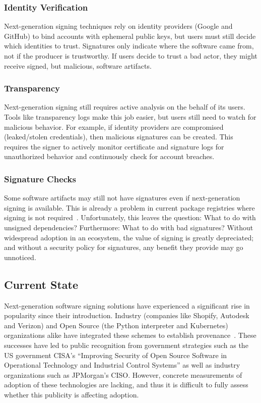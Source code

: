 \documentclass{IEEEcsmagTechrxiv}
\begin{document}
\subsubsection{Identity Verification}
Next-generation signing techniques rely on identity providers (\eg Google and GitHub) to bind accounts with ephemeral public keys, but users must still decide which identities to trust.
Signatures only indicate where the software came from, not if the producer is trustworthy.
If users decide to trust a bad actor, they might receive signed, but malicious, software artifacts.

\subsubsection{Transparency}
Next-generation signing still requires active analysis on the behalf of its users.
Tools like transparency logs make this job easier, but users still need to watch for malicious behavior.
For example, if identity providers are compromised (\eg leaked/stolen credentials), then malicious signatures can be created.
This requires the signer to actively monitor certificate and signature logs for unauthorized behavior and continuously check for account breaches.

\subsubsection{Signature Checks}
Some software artifacts may still not have signatures even if next-generation signing is available.
This is already a problem in current package registries where signing is not required~\cite{schorlemmer_signing}.
Unfortunately, this leaves the question: What to do with unsigned dependencies?
Furthermore: What to do with bad signatures?
Without widespread adoption in an ecosystem, the value of signing is greatly depreciated; and without a security policy for signatures, any benefit they provide may go unnoticed.

\subsection{Current State}

Next-generation software signing solutions have experienced a significant rise in popularity since their introduction.
Industry (\eg companies like Shopify, Autodesk and Verizon) and Open Source (\eg the Python interpreter and Kubernetes) organizations alike have integrated these schemes to establish provenance~\cite{SigstorePaper, SperanzaPaper}.
These successes have led to public recognition from government strategies such as the US government CISA's ``Improving Security of Open Source Software in Operational Technology and Industrial Control Systems'' as well as industry organizations such as JPMorgan's CISO. 
However, concrete measurements of adoption of these technologies are lacking, and thus it is difficult to fully assess whether this publicity is affecting adoption.
\end{document}
